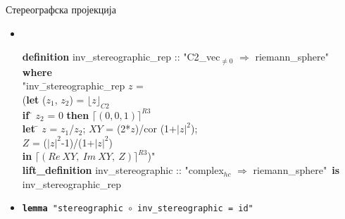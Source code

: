 \documentclass[slidestop, compress, mathserif, containsverbatim, xcolor=dvipsnames]{beamer}
\newcommand{\Repnzv}[1]{\ensuremath{\lfloor#1\rfloor_{C2}}}
\newcommand{\Absrs}[1]{\ensuremath{\lceil#1\rceil^{R3}}}
\begin{document}
\begin{frame}{Стереографска пројекција}
  \begin{itemize}
  \item \begin{footnotesize} {\tt
    \begin{tabbing}
      {\bf def}\={\bf inition} inv\_stereographic\_rep :: "{}C2\_vec$_{\neq 0}$ $\Rightarrow$ riemann\_sphere" \\
      {\bf where} \\
      \> "{}inv\=\_stereographic\_rep $z$ = \\
    \>      \> ({\bf l}\={\bf et} ($z_1$, $z_2$) = $\Repnzv{z}$  \\
    \>      \>    \= {\bf if} \= $z_2$ = 0 {\bf then} $\Absrs{(0, 0, 1)}$ \\
    \>      \>   \>     {\bf l}\={\bf et} \= $z$ = $z_1$/$z_2$; $XY$ = (2*$z$)/cor (1+$|z|^2$); \\
    \>      \>   \>    \>$Z$ = ($|z|^2$-1)/(1+$|z|^2$) \\
    \>      \>   \>    \>\> {\bf in} $\Absrs{(Re\ XY,\ Im\ XY,\ Z)}$)"\ \\
      {\bf lift\_definition} inv\_stereographic :: "{}complex$_{hc}$ $\Rightarrow$ riemann\_sphere"\ {\bf is} \\
      \>inv\_stereographic\_rep
    \end{tabbing}
    } \end{footnotesize} \vfill
  \item \begin{footnotesize} {\tt {\bf lemma} "{}stereographic $\circ$ inv\_stereographic = id"\ } \end{footnotesize}
  \end{itemize}
\end{frame}
\end{document}
